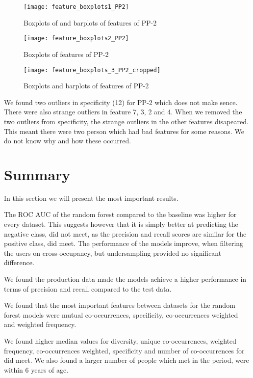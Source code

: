 \begin{figure}[H]
    \hspace*{-1.0cm}
    \centering
    \texttt{[image: feature\_boxplots1\_PP2]}
    \caption{Boxplots of and barplots of features of PP-2}
    \label{fig:feature_boxplots1_pp2}
\end{figure}

\begin{figure}[H]
    \hspace*{-1.0cm}
    \centering
    \texttt{[image: feature\_boxplots2\_PP2]}
    \caption{Boxplots of features of PP-2}
    \label{fig:feature_boxplots2_pp2}
\end{figure}
\begin{figure}[H]
    \hspace*{-1.0cm}
    \centering
    \texttt{[image: feature\_boxplots\_3\_PP2\_cropped]}
    \caption{Boxplots and barplots of features of PP-2}
    \label{fig:feature_boxplots3_pp2}
\end{figure}

We found two outliers in specificity (12) for PP-2 which does not make sence. There were also strange outliers in feature 7, 3, 2 and 4. When we removed the two outliers from specificity, the strange outliers in the other features disapeared. This meant there were two person which had bad features for some reasons. We do not know why and how these occurred. 
\section{Summary}
In this section we will present the most important results.

The ROC AUC of the random forest compared to the baseline was higher for every dataset. This suggests however that it is simply better at predicting the negative class, did not meet, as the precision and recall scores are similar for the positive class, did meet. 
The performance of the models improve, when filtering the users on cross-occupancy, but undersampling provided no significant difference.

We found the production data made the models achieve a higher performance in terms of precision and recall compared to the test data.

We found that the most important features between datasets for the random forest models were mutual co-occurrences, specificity, co-occurrences weighted and weighted frequency.

We found higher median values for diversity, unique co-occurrences, weighted frequency, co-occurrences weighted, specificity and number of co-occurrences for did meet.
We also found a larger number of people which met in the period, were within 6 years of age.